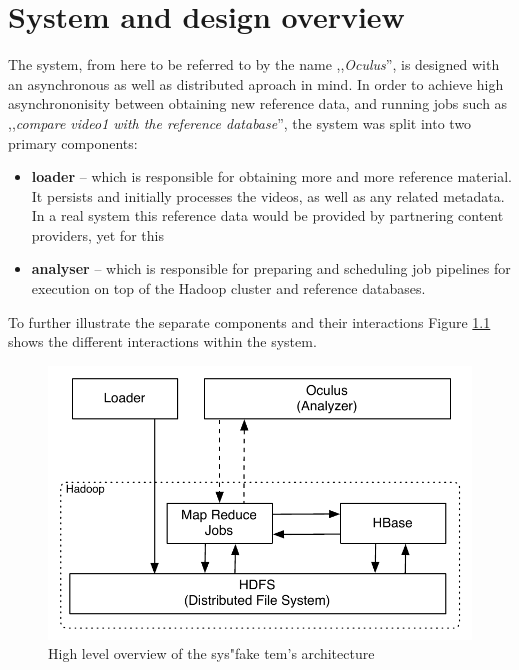 
\chapter{System and design overview}
\label{chap:system-design}

The system, from here to be referred to by the name ,,\textit{Oculus}'', is designed with an asynchronous as well as distributed aproach in mind. In order to achieve high asynchrononisity between obtaining new reference data, and running jobs such as ,,\textit{compare video1 with the reference database}'', the system was split into two primary components: 

\begin{itemize}
  \item \textbf{loader} -- which is responsible for obtaining more and more reference material. It persists and initially processes the videos, as well as any related metadata. In a real system this reference data would be provided by partnering content providers, yet for this 
  \item \textbf{analyser} -- which is responsible for preparing and scheduling job pipelines for execution on top of the Hadoop cluster and reference databases.
\end{itemize}

To further illustrate the separate components and their interactions Figure \ref{fig:system-overview} shows the different interactions within the system.

\begin{figure}[hc!]
 \centering
  \includegraphics[scale=0.9]{./diagrams/high-level-system.pdf}
  \caption{High level overview of the sys"fake tem's architecture}
  \label{fig:system-overview}
\end{figure}

